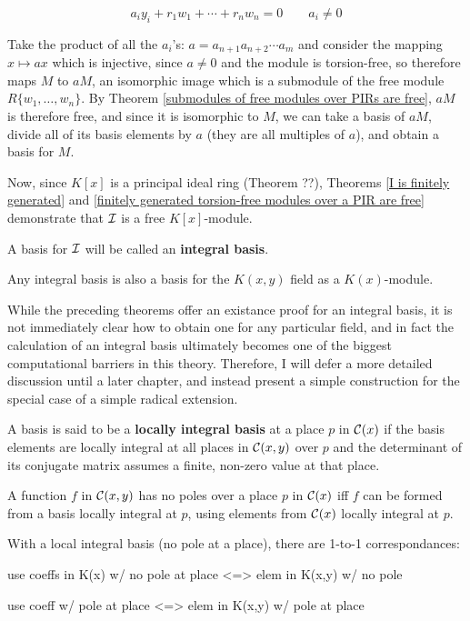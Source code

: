 $$a_i y_i + r_1 w_1 + \cdots + r_n w_n = 0 \qquad a_i \ne 0$$

Take the product of all the $a_i$'s: $a = a_{n+1} a_{n+2} \cdots a_m$
and consider the mapping $x \mapsto ax$ which is injective, since $a
\ne 0$ and the module is torsion-free, so therefore maps $M$ to $aM$,
an isomorphic image which is a submodule of the free module
$R\{w_1,\ldots,w_n\}$.  By Theorem \ref{submodules of free modules
over PIRs are free}, $aM$ is therefore free, and since it is
isomorphic to $M$, we can take a basis of $aM$, divide all of its
basis elements by $a$ (they are all multiples of $a$), and obtain
a basis for $M$.

\endtheorem

Now, since $K[x]$ is a principal ideal ring (Theorem ??), Theorems
\ref{I is finitely generated} and \ref{finitely generated torsion-free
modules over a PIR are free} demonstrate that ${\cal I}$
is a free $K[x]$-module.


A basis for ${\cal I}$ will be called an {\bf integral basis}.

\enddefinition

\theorem

Any integral basis is also a basis for the $K(x,y)$ field as a
$K(x)$-module.

\endtheorem

While the preceding theorems offer an existance proof for an integral
basis, it is not immediately clear how to obtain one for any
particular field, and in fact the calculation of an integral basis
ultimately becomes one of the biggest computational barriers in this
theory.  Therefore, I will defer a more detailed discussion until a
later chapter, and instead present a simple construction for the
special case of a simple radical extension.


A basis is said to be a {\bf locally integral basis} at a place $p$ in
${\cal C}(x)$ if the basis elements are locally integral at all places
in ${\cal C}(x,y)$ over $p$ and the determinant of its conjugate
matrix assumes a finite, non-zero value at that place.

\enddefinition

\theorem

A function $f$ in ${\cal C}(x,y)$ has no poles over a place $p$ in
${\cal C}(x)$ iff $f$ can be formed from a basis locally integral at
$p$, using elements from ${\cal C}(x)$ locally integral at $p$.

\endtheorem


With a local integral basis (no pole at a place), there are 1-to-1
correspondances:

	use coeffs in K(x) w/ no pole at place <=> elem in K(x,y) w/ no pole

	use coeff w/ pole at place <=> elem in K(x,y) w/ pole at place
